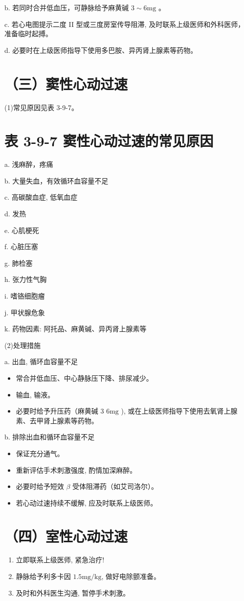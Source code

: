 \documentclass[10pt]{article}
\begin{document}
b. 若同时合并低血压，可静脉给予麻黄碱 $3 \sim 6 \mathrm{mg}$ 。

c. 若心电图提示二度 II 型或三度房室传导阻滞, 及时联系上级医师和外科医师，准备临时起搏。

d. 必要时在上级医师指导下使用多巴胺、异丙肾上腺素等药物。

\section*{（三）窦性心动过速}
(1)常见原因见表 3-9-7。

\section*{表 3-9-7 窦性心动过速的常见原因}
a. 浅麻醉，疼痛

b. 大量失血，有效循环血容量不足

c. 高碳酸血症, 低氧血症

d. 发热

e. 心肌梗死

f. 心脏压塞

g. 肺检塞

h. 张力性气胸

i. 嗜铬细胞瘤

j. 甲状腺危象

k. 药物因素: 阿托品、麻黄碱、异丙肾上腺素等

(2)处理措施

a. 出血, 循环血容量不足

\begin{itemize}
  \item 常合并低血压、中心静脉压下降、排尿减少。
  \item 输血, 输液。
  \item 必要时给予升压药（麻黄碱 3 $6 \mathrm{mg}$ ), 或在上级医师指导下使用去氧肾上腺素、去甲肾上腺素等药物。
\end{itemize}

b. 排除出血和循环血容量不足

\begin{itemize}
  \item 保证充分通气。
  \item 重新评估手术刺激强度, 酌情加深麻醉。
  \item 必要时给予短效 $\beta$ 受体阻滞药（如艾司洛尔）。
  \item 若心动过速持续不缓解, 应及时联系上级医师。
\end{itemize}

\section*{（四）室性心动过速}
\begin{enumerate}
  \item 立即联系上级医师, 紧急治疗!

  \item 静脉给予利多卡因 $1.5 \mathrm{mg} / \mathrm{kg}$, 做好电除颤准备。

  \item 及时和外科医生沟通, 暂停手术刺激。

\end{enumerate}
\end{document}
